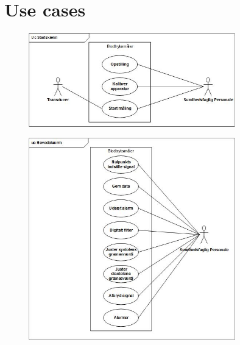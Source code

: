 \newpage


\section{Use cases}
\begin{figure}[h!]
\includegraphics[width =0.8\textwidth , right]{billeder/UCStart}
\end{figure}
\begin{figure}[h!]
\includegraphics[width =0.8\textwidth , right]{billeder/UChoved}
\end{figure}
